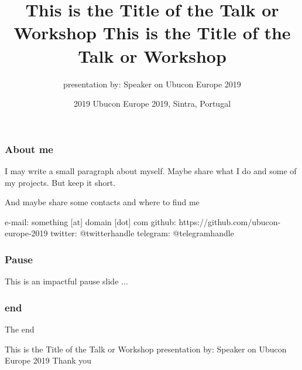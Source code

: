 \documentclass{beamer}
\title{This is the Title of the Talk or Workshop
}
\author{presentation by: Speaker on Ubucon Europe 2019}
\institute{Ubucon Europe}
\date{2019 }
\begin{document}
\frame{\titlepage}
 
\begin{frame}
\frametitle{About me}
I may write a small paragraph about myself. Maybe share what I do and some of my projects. But keep it short.

And maybe share some contacts and where to find me

e-mail: something [at] domain [dot] com
github: https://github.com/ubucon-europe-2019
twitter: @twitterhandle
telegram: @telegramhandle

\end{frame}


\begin{frame}

\frametitle{Pause}
This is an impactful pause slide ...
\end{frame}

\begin{frame}
\frametitle{end}
The end
\end{frame}



\date[October 2019] %
{Ubucon Europe 2019, Sintra, Portugal}

 \title{This is the Title of the Talk or Workshop
}

This is the Title of the Talk or Workshop
presentation by: Speaker on Ubucon Europe 2019
Thank you
\end{document}
